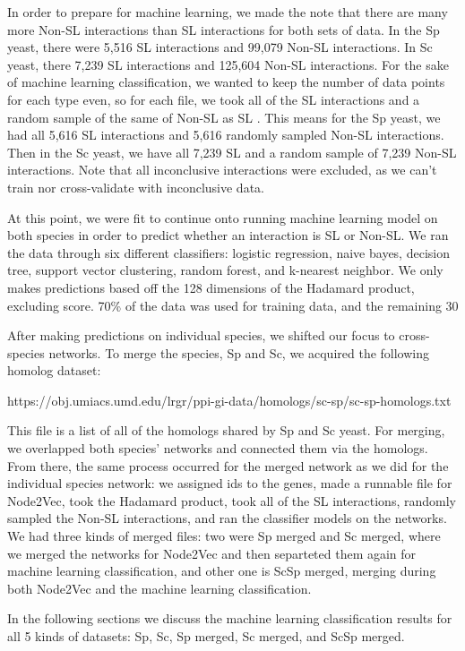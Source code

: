 In order to prepare for machine learning, we made the note that there are many more Non-SL interactions than SL interactions for both sets of data. In the Sp yeast, there were 5,516 SL interactions and 99,079 Non-SL interactions. In Sc yeast, there 7,239 SL interactions and 125,604 Non-SL interactions. For the sake of machine learning classification, we wanted to keep the number of data points for each type even, so for each file, we took all of the SL interactions and a random sample of the same of Non-SL as SL . This means for the Sp yeast, we had all 5,616 SL interactions and 5,616 randomly sampled Non-SL interactions. Then in the Sc yeast, we have all 7,239 SL and a random sample of 7,239 Non-SL interactions. Note that all inconclusive interactions were excluded, as we can’t train nor cross-validate with inconclusive data. 

At this point, we were fit to continue onto running machine learning model on both species in order to predict whether an interaction is SL or Non-SL. We ran the data through six different classifiers: logistic regression, naive bayes, decision tree, support vector clustering, random forest, and k-nearest neighbor. We only makes predictions based off the 128 dimensions of the Hadamard product, excluding score. 70\% of the data was used for training data, and the remaining 30%

After making predictions on individual species, we shifted our focus to cross-species networks. To merge the species, Sp and Sc, we acquired the following homolog dataset:

https://obj.umiacs.umd.edu/lrgr/ppi-gi-data/homologs/sc-sp/sc-sp-homologs.txt

This file is a list of all of the homologs shared by Sp and Sc yeast. For merging, we overlapped both species’ networks and connected them via the homologs. From there, the same process occurred for the merged network as we did for the individual species network: we assigned ids to the genes, made a runnable file for Node2Vec, took the Hadamard product, took all of the SL interactions, randomly sampled the Non-SL interactions, and ran the classifier models on the networks. We had three kinds of merged files: two were Sp merged and Sc merged, where we merged the networks for Node2Vec and then separteted them again for machine learning classification, and other one is ScSp merged, merging during both Node2Vec and the machine learning classification. 

In the following sections we discuss the machine learning classification results for all 5 kinds of datasets: Sp, Sc, Sp merged, Sc merged, and ScSp merged. 
